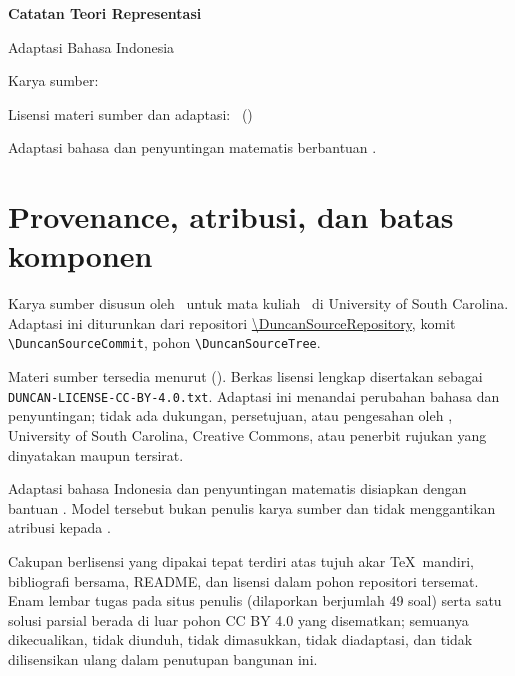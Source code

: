 \documentclass[12pt,a4paper]{article}
\begin{document}
\begin{titlepage}
\centering
\vspace*{0.12\textheight}
{\Huge\bfseries Catatan Teori Representasi\par}
\vspace{1.5em}
{\LARGE Adaptasi Bahasa Indonesia\par}
\vspace{3em}
{\Large Karya sumber: \DuncanSourceAuthor\par}
\vspace{0.75em}
{\large \DuncanSourceCourse\par}
\vfill
{\large Lisensi materi sumber dan adaptasi: \DuncanLicenseName\
(\DuncanLicenseSPDX)\par}
\vspace{0.75em}
{\normalsize Adaptasi bahasa dan penyuntingan matematis berbantuan
\DuncanModelProvenance.\par}
\vspace*{0.08\textheight}
\end{titlepage}

\section*{Provenance, atribusi, dan batas komponen}

Karya sumber disusun oleh \DuncanSourceAuthor\ untuk mata kuliah
\DuncanSourceCourse\ di University of South Carolina. Adaptasi ini diturunkan
dari repositori \url{\DuncanSourceRepository}, komit
\nolinkurl{\DuncanSourceCommit}, pohon \nolinkurl{\DuncanSourceTree}.

Materi sumber tersedia menurut \href{\DuncanLicenseURL}{\DuncanLicenseName}
(\DuncanLicenseSPDX). Berkas lisensi lengkap disertakan sebagai
\texttt{DUNCAN-LICENSE-CC-BY-4.0.txt}. Adaptasi ini menandai perubahan bahasa
dan penyuntingan; tidak ada dukungan, persetujuan, atau pengesahan oleh
\DuncanSourceAuthor, University of South Carolina, Creative Commons, atau
penerbit rujukan yang dinyatakan maupun tersirat.

Adaptasi bahasa Indonesia dan penyuntingan matematis disiapkan dengan bantuan
\DuncanModelProvenance. Model tersebut bukan penulis karya sumber dan tidak
menggantikan atribusi kepada \DuncanSourceAuthor.

Cakupan berlisensi yang dipakai tepat terdiri atas tujuh akar \TeX\ mandiri,
bibliografi bersama, README, dan lisensi dalam pohon repositori tersemat.
Enam lembar tugas pada situs penulis (dilaporkan berjumlah 49 soal) serta satu
solusi parsial berada di luar pohon CC BY 4.0 yang disematkan; semuanya
dikecualikan, tidak diunduh, tidak dimasukkan, tidak diadaptasi, dan tidak
dilisensikan ulang dalam penutupan bangunan ini.
\end{document}
